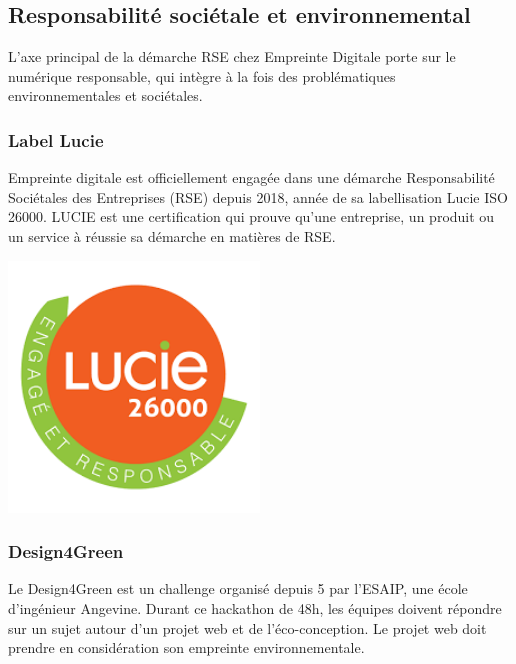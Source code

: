 \documentclass[12pt, a4paper, twoside]{article}
\begin{document}
\subsection{Responsabilité sociétale et environnemental}
L'axe principal de la démarche \gls{RSE} chez Empreinte Digitale porte sur le numérique responsable, qui intègre à la fois des problématiques environnementales et sociétales.

\subsubsection{Label Lucie}
\noindent%
\begin{minipage}{.7\textwidth}%
Empreinte digitale est officiellement engagée dans une démarche Responsabilité Sociétales des Entreprises (\gls{RSE}) depuis 2018, année de sa labellisation Lucie \gls{ISO} 26000. 
LUCIE est une certification qui prouve qu'une entreprise, un produit ou un service à réussie sa démarche en matières de \gls{RSE}. \cite{Lucie}

\end{minipage}%
\hfill
\begin{minipage}{.3\textwidth}%
\begin{center}
\includegraphics[width=0.5\textwidth]{src/logo_lucie.png}
\end{center}
\end{minipage}%

\subsubsection{Design4Green}
Le Design4Green est un challenge organisé depuis 5 par l'ESAIP, une école d'ingénieur Angevine.
Durant ce hackathon de 48h, les équipes doivent répondre sur un sujet autour d'un projet web et de l'éco-conception.
Le projet web doit prendre en considération son empreinte environnementale.
\end{document}
